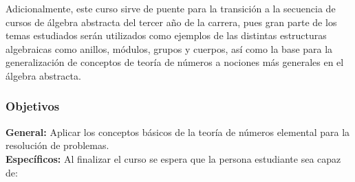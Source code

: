 \begin{refsection}
Adicionalmente, este curso sirve de puente para la transición a la secuencia de cursos de álgebra abstracta del tercer año de la carrera, pues gran parte de los temas estudiados serán utilizados como ejemplos de las distintas estructuras algebraicas como anillos, módulos, grupos y cuerpos, así como la base para la generalización de conceptos de teoría de números a nociones más generales en el álgebra abstracta.

\subsubsection*{Objetivos}

\textbf{General:} Aplicar los conceptos básicos de la teoría de números elemental para la resolución de problemas. \\

\textbf{Específicos:} Al finalizar el curso se espera que la persona estudiante sea capaz de:


\end{refsection}
